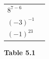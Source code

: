{{\begin{center}
\begin{xtabular}[t]{|l|l|}
     \tabularnewline{}
                  ${8}^{7-6}$
                 &
     \tabularnewline{}
                  ${\left(-3\right)}^{-1}$
                 &
     \tabularnewline{}
                  ${\left(-1\right)}^{23}$
                 &
     \tabularnewline{}
    \end{xtabular}
      \end{center}
    \begin{center}{\small\bfseries Table 5.1}\end{center}
          } %
        }{%
        }
